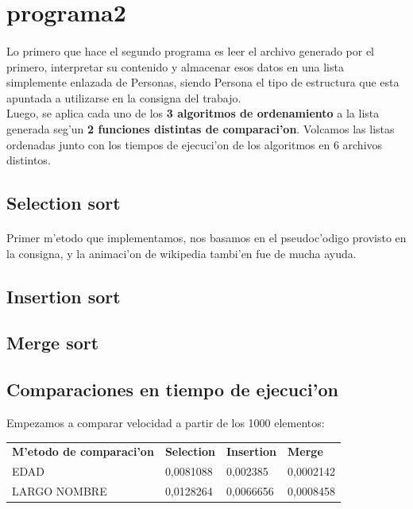 \documentclass{article}
\begin{document}
	\section{programa2}
	\paragraph{}
	Lo primero que hace el segundo programa es leer el archivo generado por el primero, interpretar su contenido y almacenar esos datos en una lista simplemente enlazada de Personas, siendo Persona el tipo de estructura que esta apuntada a utilizarse en la consigna del trabajo.\\
	
	Luego, se aplica cada uno de los \textbf{3 algoritmos de ordenamiento} a la lista generada seg'un \textbf{2 funciones distintas de comparaci'on}. Volcamos las listas ordenadas junto con los tiempos de ejecuci'on de los algoritmos en 6 archivos distintos.\\
	\subsection{Selection sort}
	\paragraph{}
	Primer m'etodo que implementamos, nos basamos en el pseudoc'odigo provisto en la consigna, y la animaci'on de wikipedia tambi'en fue de mucha ayuda.
	\subsection{Insertion sort}
	\subsection{Merge sort}
	
	\subsection{Comparaciones en tiempo de ejecuci'on}
	Empezamos a comparar velocidad a partir de los 1000 elementos:
	
	\begin{tabular}{llll}
		\textbf{M'etodo de comparaci'on} & \textbf{Selection} & \textbf{Insertion} & \textbf{Merge} \\
		EDAD & 0,0081088 & 0,002385 & 0,0002142 \\
		LARGO NOMBRE & 0,0128264 & 0,0066656 & 0,0008458 \\
	\end{tabular}\\\\
	
\end{document}
